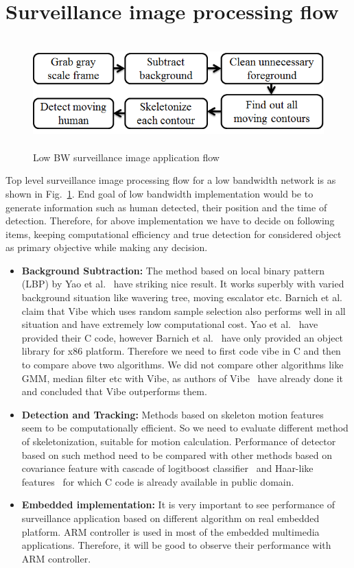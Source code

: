 \section{Surveillance image processing flow}
\begin{figure}[!b]
\centering
\includegraphics[height=120pt]{Figures/image_pipeline}
\caption{Low BW surveillance image application flow}
\label{image_pipeline}
\end{figure}
\indent Top level surveillance image processing flow for a low bandwidth
network is as shown in Fig.~\ref{image_pipeline}. End goal of low
bandwidth implementation would be to generate information such as human
detected, their position and the time of detection. Therefore, for above
implementation we have to decide on following items, keeping
computational efficiency and true detection for considered object as
primary objective while making any decision.\\
\begin{itemize}
 \item \textbf{Background Subtraction:} The method based on local binary
 pattern (LBP) by Yao et al.~\cite{11} have striking nice result. It
 works superbly with
 varied background situation like wavering tree, moving escalator
 etc. Barnich et al.~\cite{9} claim that Vibe which uses random
 sample selection also performs well in all situation and have
 extremely low computational cost. Yao et al.~\cite{11} have provided their
 C code, however Barnich et al.~\cite{9} have only provided an object
 library for x86 platform. Therefore we need to first code vibe
 in C and then to compare above two algorithms. We did not
 compare other algorithms like GMM, median filter etc with Vibe,
 as authors of Vibe~\cite{9} have already done it and concluded that Vibe
 outperforms them.
\item \textbf{Detection and Tracking:} Methods based on skeleton motion
 features~\cite{32, 22, 31} seem to be computationally
 efficient. So we need to evaluate different method of
 skeletonization, suitable for motion calculation. Performance of
 detector based on such method need to be compared with other
 methods based on covariance feature with cascade of logitboost
 classifier~\cite{19} and Haar-like features~\cite{17} for
 which C code is already available in public domain.
\item \textbf{Embedded implementation:} It is very important to see
 performance of surveillance application based on different
 algorithm on real embedded platform. ARM controller is used in
 most of the embedded multimedia applications. Therefore, it will be
 good to observe their performance with ARM controller.
\end{itemize}
